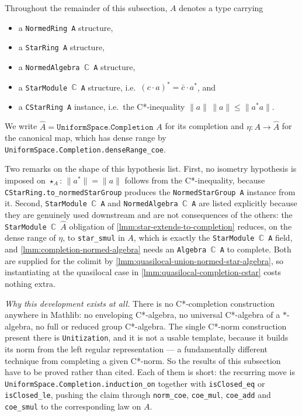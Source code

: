 \begin{definition}
    \label{def:completion-standing-hypotheses}
    \leanok
    Throughout the remainder of this subsection, $A$ denotes a type carrying
    \begin{itemize}
        \item a \texttt{NormedRing A} structure,
        \item a \texttt{StarRing A} structure,
        \item a \texttt{NormedAlgebra \ensuremath{\mathbb{C}} A} structure,
        \item a \texttt{StarModule \ensuremath{\mathbb{C}} A} structure, i.e.\ $(c \cdot a)^{*} = \bar{c} \cdot a^{*}$, and
        \item a \texttt{CStarRing A} instance, i.e.\ the C*-inequality $\|a\|\,\|a\| \le \|a^{*}a\|$.
    \end{itemize}
    We write $\widehat{A} = \texttt{UniformSpace.Completion } A$ for its completion and $\eta : A \to \widehat{A}$ for the canonical map, which has dense range by \texttt{UniformSpace.Completion.denseRange\_coe}.

    Two remarks on the shape of this hypothesis list. First, no isometry hypothesis is imposed on $\star_A$: $\|a^{*}\| = \|a\|$ follows from the C*-inequality, because \texttt{CStarRing.to\_normedStarGroup} produces the \texttt{NormedStarGroup A} instance from it. Second, \texttt{StarModule \ensuremath{\mathbb{C}} A} and \texttt{NormedAlgebra \ensuremath{\mathbb{C}} A} are listed explicitly because they are genuinely used downstream and are not consequences of the others: the \texttt{StarModule \ensuremath{\mathbb{C}} \ensuremath{\widehat{A}}} obligation of \ref{lmm:star-extends-to-completion} reduces, on the dense range of $\eta$, to \texttt{star\_smul} in $A$, which is exactly the \texttt{StarModule \ensuremath{\mathbb{C}} A} field, and \ref{lmm:completion-normed-algebra} needs an \texttt{Algebra \ensuremath{\mathbb{C}} A} to complete. Both are supplied for the colimit by \ref{lmm:quasilocal-union-normed-star-algebra}, so instantiating at the quasilocal case in \ref{lmm:quasilocal-completion-cstar} costs nothing extra.

    \emph{Why this development exists at all.} There is no C*-completion construction anywhere in Mathlib: no enveloping C*-algebra, no universal C*-algebra of a $*$-algebra, no full or reduced group C*-algebra. The single C*-norm construction present there is \texttt{Unitization}, and it is not a usable template, because it builds its norm from the left regular representation --- a fundamentally different technique from completing a given C*-norm. So the results of this subsection have to be proved rather than cited. Each of them is short: the recurring move is \texttt{UniformSpace.Completion.induction\_on} together with \texttt{isClosed\_eq} or \texttt{isClosed\_le}, pushing the claim through \texttt{norm\_coe}, \texttt{coe\_mul}, \texttt{coe\_add} and \texttt{coe\_smul} to the corresponding law on $A$.
\end{definition}


